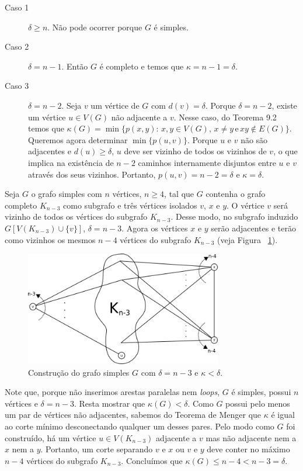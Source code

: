 
\begin{description}
    \item[Caso 1] $\delta \ge n$. Não pode ocorrer porque $G$ é simples.

    \item[Caso 2] $\delta = n -1$. Então $G$ é completo e temos que $\kappa = n
    - 1 = \delta$.

    \item[Caso 3] $\delta = n - 2$. Seja $v$ um vértice de $G$ com $d(v) =
    \delta$. Porque $\delta = n - 2$, existe um vértice $u \in V(G)$ não
    adjacente a $v$. Nesse caso, do Teorema 9.2 temos que $\kappa(G) =
    \min\{p(x,y): \,x,y \in V(G), \,x \ne y \, \text{e} \, xy \not \in E(G)\}$.
    Queremos agora determinar $\min \{p(u,v)\}$. Porque $u$ e $v$ não são
    adjacentes e $d(u) \ge \delta$, $u$ deve ser vizinho de todos os vizinhos
    de $v$, o que implica na existência de $n-2$ caminhos internamente
    disjuntos entre $u$ e $v$ através dos seus vizinhos. Portanto, $p(u,v) = n
    - 2 = \delta$ e $\kappa = \delta$.
\end{description}
\fimprova

Seja $G$ o grafo simples com $n$ vértices, $n \ge 4$, tal que $G$ contenha o
grafo completo $K_{n-3}$ como subgrafo e três vértices isolados $v$, $x$ e $y$.
O vértice $v$ será vizinho de todos os vértices do subgrafo $K_{n-3}$. Desse
modo, no subgrafo induzido $G[V(K_{n-3}) \cup \{v\}]$, $\delta = n - 3$. Agora
os vértices $x$ e $y$ serão adjacentes e terão como vizinhos os mesmos $n-4$
vértices do subgrafo $K_{n-3}$ (veja Figura ~\ref{fig:grafokappa}).

\begin{figure}[htb]
    \centering
    \includegraphics[height=5cm, width=8.6cm]{figuras/graph_q913}
    \caption{Construção do grafo simples $G$ com $\delta = n - 3$ e $\kappa <
    \delta$.}
    \label{fig:grafokappa}
\end{figure}

Note que, porque não inserimos arestas paralelas nem \emph{loops}, $G$ é
simples, possui $n$ vértices e $\delta = n - 3$. Resta mostrar que $\kappa(G) <
\delta$. Como $G$ possui pelo menos um par de vértices não adjacentes, sabemos
do Teorema de Menger que $\kappa$ é igual ao corte mínimo desconectando
qualquer um desses pares. Pelo modo como $G$ foi construído, há um vértice $u
\in V(K_{n-3})$ adjacente a $v$ mas não adjacente nem a $x$ nem a $y$.
Portanto, um corte separando $v$ e $x$ ou $v$ e $y$ deve conter no máximo $n -
4$ vértices do subgrafo $K_{n-3}$. Concluímos que $\kappa(G) \le n - 4 < n - 3
= \delta$.
\fimprova

